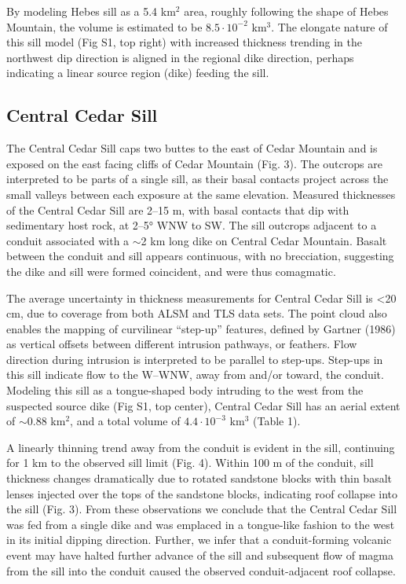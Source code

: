 \documentclass[12pt,letter]{article}
\begin{document}
By modeling Hebes sill as a 5.4 km$^2$ area, roughly following the shape of Hebes Mountain, the volume is estimated to be $8.5\cdot 10^{-2}$ km$^3$. The elongate nature of this sill model (Fig S1, top right) with increased thickness trending in the northwest dip direction is aligned in the regional dike direction, perhaps indicating a linear source region (dike) feeding the sill.

\subsection{Central Cedar Sill}

The Central Cedar Sill caps two buttes to the east of Cedar Mountain and is exposed on the east facing cliffs of Cedar Mountain (Fig. 3). The outcrops are interpreted to be parts of a single sill, as their basal contacts project across the small valleys between each exposure at the same elevation. Measured thicknesses of the Central Cedar Sill are 2–15 m, with basal contacts that dip with sedimentary host rock, at 2–5° WNW to SW. The sill outcrops adjacent to a conduit associated with a $\sim$2 km long dike on Central Cedar Mountain. Basalt between the conduit and sill appears continuous, with no brecciation, suggesting the dike and sill were formed coincident, and were thus comagmatic.

The average uncertainty in thickness measurements for Central Cedar Sill is <20 cm, due to coverage from both ALSM and TLS data sets. The point cloud also enables the mapping of curvilinear “step-up” features, defined by Gartner (1986) as vertical offsets between different intrusion pathways, or feathers. Flow direction during intrusion is interpreted to be parallel to step-ups. Step-ups in this sill indicate flow to the W–WNW, away from and/or toward, the conduit. Modeling this sill as a tongue-shaped body intruding to the west from the suspected source dike (Fig S1, top center), Central Cedar Sill has an aerial extent of $\sim$0.88 km$^2$, and a total volume of $4.4\cdot 10^{-3}$ km$^3$ (Table 1).

A linearly thinning trend away from the conduit is evident in the sill, continuing for 1 km to the observed sill limit (Fig. 4). Within 100 m of the conduit, sill thickness changes dramatically due to rotated sandstone blocks with thin basalt lenses injected over the tops of the sandstone blocks, indicating roof collapse into the sill (Fig. 3). From these observations we conclude that the Central Cedar Sill was fed from a single dike and was emplaced in a tongue-like fashion to the west in its initial dipping direction. Further, we infer that a conduit-forming volcanic event may have halted further advance of the sill and subsequent flow of magma from the sill into the conduit caused the observed conduit-adjacent roof collapse.
\end{document}
